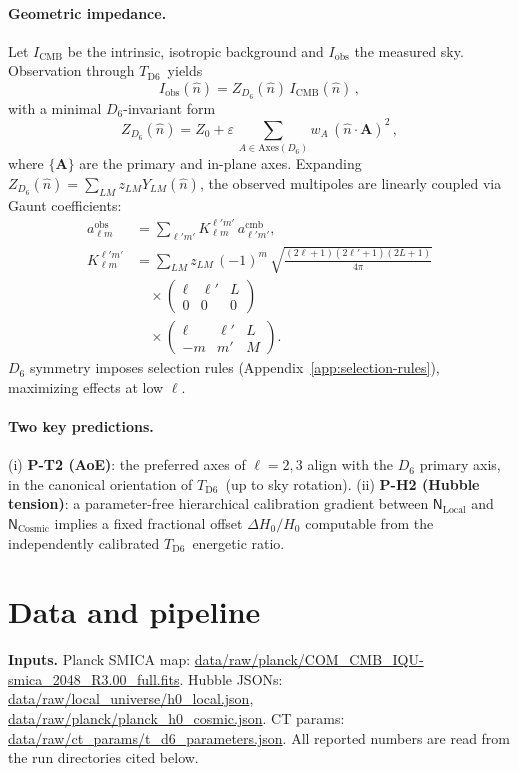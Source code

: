 \documentclass[reprint,aps,prl,twocolumn,nofootinbib,longbibliography]{revtex4-2}
\DeclareRobustCommand{\Nlocal}{\mathsf{N}_{\mathrm{Local}}}
\DeclareRobustCommand{\Ncosmic}{\mathsf{N}_{\mathrm{Cosmic}}}
\DeclareRobustCommand{\TDS}{\ensuremath{T_{\mathrm{D6}}}}
\DeclareRobustCommand{\eps}{\varepsilon}
\newcommand{\ThreeJ}[6]{\begin{pmatrix} #1 & #2 & #3 \\ #4 & #5 & #6 \end{pmatrix}}
\begin{document}
\paragraph{Geometric impedance.}
Let $I_{\mathrm{CMB}}$ be the intrinsic, isotropic background and $I_{\mathrm{obs}}$ the measured sky. Observation through \TDS\ yields
\begin{equation}
I_{\mathrm{obs}}(\hat{n}) = Z_{D_6}(\hat{n})\, I_{\mathrm{CMB}}(\hat{n})\,,\label{eq:obs}
\end{equation}
with a minimal $D_6$-invariant form
\begin{equation}
Z_{D_6}(\hat{n}) = Z_0 + \eps\,\sum_{A\in \mathrm{Axes}(D_6)} w_A\, (\hat{n}\!\cdot\! \bm{A})^2\,,\label{eq:Z}
\end{equation}
where $\{\bm{A}\}$ are the primary and in-plane axes. Expanding $Z_{D_6}(\hat{n})=\sum_{LM}z_{LM} Y_{LM}(\hat{n})$, the observed multipoles are linearly coupled via Gaunt coefficients:
\begin{align}
a_{\ell m}^{\mathrm{obs}} &= \sum_{\ell' m'} K_{\ell m}^{\ell' m'}\, a_{\ell' m'}^{\mathrm{cmb}},\label{eq:coupling}\\[2pt]
K_{\ell m}^{\ell' m'} &= \sum_{LM} z_{LM}\, (-1)^m\, \sqrt{\frac{(2\ell{+}1)(2\ell'{+}1)(2L{+}1)}{4\pi}} 
\nonumber\\[-2pt]
&\quad \times \ThreeJ{\ell}{\ell'}{L}{0}{0}{0}
\nonumber\\[-2pt]
&\quad \times \ThreeJ{\ell}{\ell'}{L}{-m}{m'}{M}.
\nonumber
\end{align}
$D_6$ symmetry imposes selection rules (Appendix~\ref{app:selection-rules}), maximizing effects at low $\ell$.

\paragraph{Two key predictions.}
(i) \textbf{P-T2 (AoE)}: the preferred axes of $\ell{=}2,3$ align with the $D_6$ primary axis, in the canonical orientation of \TDS\ (up to sky rotation). (ii) \textbf{P-H2 (Hubble tension)}: a parameter-free hierarchical calibration gradient between $\Nlocal$ and $\Ncosmic$ implies a fixed fractional offset $\Delta H_0/H_0$ computable from the independently calibrated \TDS\ energetic ratio.

\section{Data and pipeline}
\textbf{Inputs.} Planck SMICA map: \url{data/raw/planck/COM_CMB_IQU-smica_2048_R3.00_full.fits}. Hubble JSONs: \url{data/raw/local_universe/h0_local.json}, \url{data/raw/planck/planck_h0_cosmic.json}. CT params: \url{data/raw/ct_params/t_d6_parameters.json}. All reported numbers are read from the run directories cited below.
\end{document}
